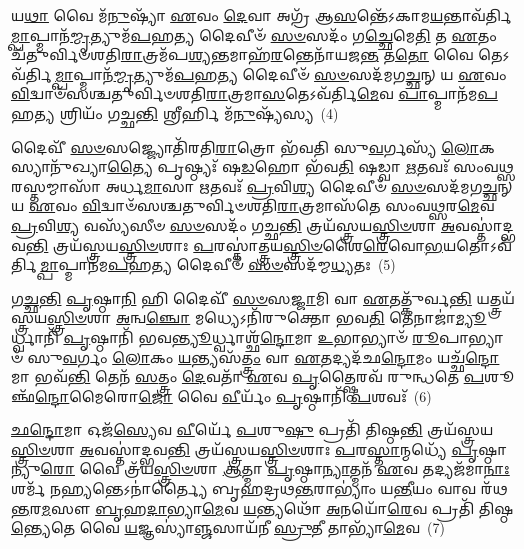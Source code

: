 𑌯\-\ul{𑌥𑌾} 𑌵𑍈 𑌮᳴\-\ul{𑌨𑍁}\-𑌷𑍍𑌯𑌾᳴ \ul{𑌏}\-𑌵𑌂 \ul{𑌦𑍇}\-𑌵𑌾 𑌅𑌗𑍍𑌰᳴ 𑌆\-\ul{𑌸}\-𑌨𑍍𑌤𑍇᳴\-𑌽𑌕𑌾𑌮\-\ul{𑌯}\-𑌨𑍍𑌤𑌾𑌵᳴𑌰𑍍𑌤𑌿\-\ul{𑌮𑍍𑌪𑌾}\-𑌪𑍍𑌮𑌾𑌨᳴\-\ul{𑌮𑍍𑌮𑍃}\-𑌤𑍍𑌯𑍁𑌮᳴\-\ul{𑌪}\-𑌹\-\ul{𑌤𑍍𑌯} 𑌦𑍈𑌵𑍀𑍞᳴ \ul{𑌸}\-\-\ul{𑍞}\-𑌸𑌦𑌂᳴ 𑌗\-\ul{𑌚𑍍𑌛𑍇}\-𑌮𑍇\-\ul{𑌤𑌿} 𑌤 \ul{𑌏}\-𑌤𑌂 𑌚᳴𑌤𑍁𑌰𑍍𑌵𑌿𑍞𑌶𑌤𑌿\-\ul{𑌰𑌾}\-𑌤𑍍𑌰𑌮᳴𑌪\-\ul{𑌶𑍍𑌯}\-𑌨𑍍𑌤𑌮𑌾𑌹᳴\-\ul{𑌰}\-𑌨𑍍𑌤𑍇𑌨𑌾᳴𑌯𑌜\-\ul{𑌨𑍍𑌤} 𑌤\-\ul{𑌤𑍋} 𑌵𑍈 𑌤𑍇\-𑌽𑌵᳴𑌰𑍍𑌤𑌿\-\ul{𑌮𑍍𑌪𑌾}\-𑌪𑍍𑌮𑌾𑌨᳴\-\ul{𑌮𑍍𑌮𑍃}\-𑌤𑍍𑌯𑍁𑌮᳴\-\ul{𑌪}\-𑌹\-\ul{𑌤𑍍𑌯} 𑌦𑍈𑌵𑍀𑍞᳴ \ul{𑌸}\-\-\ul{𑍞}\-𑌸𑌦᳴𑌮𑌗\-\ul{𑌚𑍍𑌛}\-𑌨𑍍 𑌯 \ul{𑌏}\-𑌵𑌂 \ul{𑌵𑌿}\-𑌦𑍍𑌵𑌾𑍞᳴𑌸𑌶𑍍𑌚𑌤𑍁𑌰𑍍𑌵𑌿𑍞𑌶𑌤𑌿\-\ul{𑌰𑌾}\-𑌤𑍍𑌰𑌮𑌾\-\ul{𑌸}\-𑌤𑍇\-𑌽𑌵᳴𑌰𑍍𑌤𑌿\-\ul{𑌮𑍇}\-𑌵 \ul{𑌪𑌾}\-𑌪𑍍𑌮𑌾𑌨᳴𑌮\-\ul{𑌪}\-𑌹\-\ul{𑌤𑍍𑌯} 𑌶𑍍𑌰𑌿𑌯𑌂᳴ 𑌗𑌚𑍍𑌛\-\ul{𑌨𑍍𑌤𑌿} 𑌶𑍍𑌰𑍀𑌰𑍍\mbox{}𑌹𑌿 𑌮᳴\-\ul{𑌨𑍁}\-𑌷𑍍𑌯᳴𑌸𑍍𑌯~(4)

𑌦𑍈𑌵𑍀᳴ \ul{𑌸}\-\-\ul{𑍞}\-𑌸𑌜𑍍𑌜𑍍𑌯𑍋𑌤𑌿᳴𑌰𑌤𑌿\-\ul{𑌰𑌾}\-𑌤𑍍𑌰𑍋 𑌭᳴𑌵𑌤𑌿 𑌸𑍁\-\ul{𑌵}\-𑌰𑍍𑌗𑌸𑍍𑌯᳴ \ul{𑌲𑍋}\-𑌕𑌸𑍍𑌯𑌾𑌨𑍁᳴𑌖𑍍𑌯𑌾\-\ul{𑌤𑍍𑌯𑍈} 𑌪𑍃𑌷𑍍𑌠𑍍𑌯𑌃᳴ 𑌷\-\ul{𑌡}\-𑌹𑍋 𑌭᳴𑌵\-\ul{𑌤𑌿} 𑌷𑌡𑍍𑌵𑌾 \ul{𑌋}\-𑌤𑌵𑌃᳴ 𑌸𑌂𑌵\-\ul{𑌥𑍍𑌸}\-𑌰𑌸𑍍𑌤𑌮𑍍𑌮𑌾𑌸𑌾᳴ 𑌅𑌰𑍍𑌧\-\ul{𑌮𑌾}\-𑌸𑌾 \ul{𑌋}\-𑌤𑌵𑌃᳴ \ul{𑌪𑍍𑌰}\-𑌵𑌿\-\ul{𑌶𑍍𑌯} 𑌦𑍈𑌵𑍀𑍞᳴ \ul{𑌸}\-\-\ul{𑍞}\-𑌸𑌦᳴𑌮𑌗\-\ul{𑌚𑍍𑌛}\-𑌨𑍍 𑌯 \ul{𑌏}\-𑌵𑌂 \ul{𑌵𑌿}\-𑌦𑍍𑌵𑌾𑍞᳴𑌸𑌶𑍍𑌚𑌤𑍁𑌰𑍍𑌵𑌿𑍞𑌶𑌤𑌿\-\ul{𑌰𑌾}\-𑌤𑍍𑌰𑌮𑌾𑌸᳴𑌤𑍇 𑌸𑌂𑌵\-\ul{𑌥𑍍𑌸}\-𑌰\-\ul{𑌮𑍇}\-𑌵 \ul{𑌪𑍍𑌰}\-𑌵𑌿\-\ul{𑌶𑍍𑌯} 𑌵𑌸𑍍𑌯᳴𑌸𑍀𑍞 \ul{𑌸}\-\-\ul{𑍞}\-𑌸𑌦𑌂᳴ 𑌗𑌚𑍍𑌛\-\ul{𑌨𑍍𑌤𑌿} 𑌤𑍍𑌰𑌯᳴𑌸𑍍𑌤𑍍𑌰𑌯\-\ul{𑌸𑍍𑌤𑍍𑌰𑌿}\-\-\ul{𑍞}\-𑌶𑌾 \ul{𑌅}\-𑌵𑌸𑍍𑌤𑌾॑𑌦𑍍𑌭𑌵\-\ul{𑌨𑍍𑌤𑌿} 𑌤𑍍𑌰𑌯᳴𑌸𑍍𑌤𑍍𑌰𑌯\-\ul{𑌸𑍍𑌤𑍍𑌰𑌿}\-\-\ul{𑍞}\-𑌶𑌾𑌃 \ul{𑌪}\-𑌰𑌸𑍍𑌤𑌾॑𑌤𑍍𑌤𑍍𑌰𑌯\-\ul{𑌸𑍍𑌤𑍍𑌰𑌿}\-\-\ul{𑍞}\-𑌶𑍈\-\ul{𑌰𑍇}\-𑌵𑍋\-\ul{𑌭}\-𑌯𑌤𑍋\-𑌽𑌵᳴𑌰𑍍𑌤𑌿\-\ul{𑌮𑍍𑌪𑌾}\-𑌪𑍍𑌮𑌾𑌨᳴𑌮\-\ul{𑌪}\-𑌹\-\ul{𑌤𑍍𑌯} 𑌦𑍈𑌵𑍀𑍞᳴ \ul{𑌸}\-\-\ul{𑍞}\-𑌸𑌦᳴𑌮𑍍𑌮\-\ul{𑌧𑍍𑌯}\-𑌤𑌃~(5)

\-\ul{𑌗}\-\-\ul{𑌚𑍍𑌛}\-\-\ul{𑌨𑍍𑌤𑌿} \ul{𑌪𑍃}\-𑌷𑍍𑌠𑌾\-\ul{𑌨𑌿} 𑌹𑌿 𑌦𑍈𑌵𑍀᳴ \ul{𑌸}\-\-\ul{𑍞}\-𑌸\-\ul{𑌜𑍍𑌜𑌾}\-𑌮𑌿 𑌵𑌾 \ul{𑌏}\-𑌤𑌤𑍍𑌕𑍁᳴𑌰𑍍𑌵\-\ul{𑌨𑍍𑌤𑌿} 𑌯𑌤𑍍𑌤𑍍𑌰𑌯᳴𑌸𑍍𑌤𑍍𑌰𑌯\-\ul{𑌸𑍍𑌤𑍍𑌰𑌿}\-\-\ul{𑍞}\-𑌶𑌾 \ul{𑌅}\-𑌨𑍍𑌵\-\ul{𑌞𑍍𑌚𑍋} 𑌮𑌧𑍍𑌯𑍇\-𑌽𑌨𑌿᳴𑌰𑍁𑌕𑍍𑌤𑍋 𑌭𑌵\-\ul{𑌤𑌿} 𑌤𑍇𑌨𑌾𑌜𑌾॑\-\ul{𑌮𑍍𑌯𑍂}\-𑌰𑍍𑌧𑍍𑌵𑌾𑌨𑌿᳴ \ul{𑌪𑍃}\-𑌷𑍍𑌠𑌾𑌨𑌿᳴ 𑌭𑌵\-\ul{𑌨𑍍𑌤𑍍𑌯𑍂}\-𑌰𑍍𑌧𑍍𑌵𑌾𑌶𑍍𑌛᳴\-\ul{𑌨𑍍𑌦𑍋}\-𑌮𑌾 \ul{𑌉}\-𑌭𑌾𑌭𑍍𑌯𑌾𑍞᳴ \ul{𑌰𑍂}\-𑌪𑌾𑌭𑍍𑌯𑌾𑍞᳴ 𑌸𑍁\-\ul{𑌵}\-𑌰𑍍𑌗𑌂 \ul{𑌲𑍋}\-𑌕𑌂 \ul{𑌯}\-𑌨𑍍𑌤𑍍𑌯𑌸᳴\-\ul{𑌤𑍍𑌤𑍍𑌰𑌂} 𑌵𑌾 \ul{𑌏}\-𑌤𑌦𑍍𑌯𑌦᳴𑌛\-\ul{𑌨𑍍𑌦𑍋}\-𑌮𑌂 𑌯𑌚𑍍𑌛᳴\-\ul{𑌨𑍍𑌦𑍋}\-𑌮𑌾 𑌭𑌵᳴\-\ul{𑌨𑍍𑌤𑌿} 𑌤𑍇𑌨᳴ \ul{𑌸}\-𑌤𑍍𑌤𑍍𑌰𑌂 \ul{𑌦𑍇}\-𑌵𑌤𑌾᳴ \ul{𑌏}\-𑌵 \ul{𑌪𑍃}\-𑌤𑍍𑌷𑍍𑌠𑍈𑌰𑌵᳴ 𑌰𑍁𑌨𑍍𑌧𑌤𑍇 \ul{𑌪}\-𑌶𑍂𑌞𑍍𑌛᳴\-\ul{𑌨𑍍𑌦𑍋}\-𑌮𑍈𑌰𑍋\-\ul{𑌜𑍋} 𑌵𑍈 \ul{𑌵𑍀}\-𑌰𑍍𑌯𑌂᳴ \ul{𑌪𑍃}\-𑌷𑍍𑌠𑌾𑌨𑌿᳴ \ul{𑌪}\-𑌶𑌵𑌃᳴~(6)

\-\ul{𑌛}\-\-\ul{𑌨𑍍𑌦𑍋}\-𑌮𑌾 𑌓𑌜᳴\-\ul{𑌸𑍍𑌯𑍇}\-𑌵 \ul{𑌵𑍀}\-𑌰𑍍𑌯𑍇᳴ \ul{𑌪}\-𑌶𑍁\-\ul{𑌷𑍁} 𑌪𑍍𑌰𑌤𑌿᳴ 𑌤𑌿𑌷𑍍𑌠\-\ul{𑌨𑍍𑌤𑌿} 𑌤𑍍𑌰𑌯᳴𑌸𑍍𑌤𑍍𑌰𑌯\-\ul{𑌸𑍍𑌤𑍍𑌰𑌿}\-\-\ul{𑍞}\-𑌶𑌾 \ul{𑌅}\-𑌵𑌸𑍍𑌤𑌾॑𑌦𑍍𑌭𑌵\-\ul{𑌨𑍍𑌤𑌿} 𑌤𑍍𑌰𑌯᳴𑌸𑍍𑌤𑍍𑌰𑌯\-\ul{𑌸𑍍𑌤𑍍𑌰𑌿}\-\-\ul{𑍞}\-𑌶𑌾𑌃 \ul{𑌪}\-𑌰\-\ul{𑌸𑍍𑌤𑌾}\-𑌨𑍍𑌮𑌧𑍍𑌯𑍇᳴ \ul{𑌪𑍃}\-𑌷𑍍𑌠𑌾𑌨𑍍𑌯𑍁\-\ul{𑌰𑍋} 𑌵𑍈 𑌤𑍍𑌰᳴𑌯\-\ul{𑌸𑍍𑌤𑍍𑌰𑌿}\-\-\ul{𑍞}\-𑌶𑌾 \ul{𑌆}\-𑌤𑍍𑌮𑌾 \ul{𑌪𑍃}\-𑌷𑍍𑌠𑌾\-\ul{𑌨𑍍𑌯𑌾}\-𑌤𑍍𑌮𑌨᳴ \ul{𑌏}\-𑌵 𑌤𑌦𑍍𑌯𑌜᳴𑌮𑌾\-\ul{𑌨𑌾𑌃} 𑌶𑌰𑍍𑌮᳴ 𑌨\-\ul{𑌹𑍍𑌯}\-𑌨𑍍𑌤𑍇\-𑌽𑌨𑌾॑𑌰𑍍𑌤𑍍𑌯𑍈 𑌬𑍃𑌹𑌦𑍍𑌰𑌥\-\ul{𑌨𑍍𑌤}\-𑌰𑌾\-𑌭𑍍𑌯𑌾𑌂॑ 𑌯\-\ul{𑌨𑍍𑌤𑍀}\-𑌯𑌂 𑌵𑌾𑌵 𑌰᳴𑌥\-\ul{𑌨𑍍𑌤}\-𑌰\-\ul{𑌮}\-𑌸𑍗 \ul{𑌬𑍃}\-𑌹\-\ul{𑌦𑌾}\-𑌭𑍍𑌯𑌾\-\ul{𑌮𑍇}\-𑌵 \ul{𑌯}\-𑌨𑍍𑌤𑍍𑌯𑌥𑍋᳴ \ul{𑌅}\-𑌨𑌯𑍋᳴\-\ul{𑌰𑍇}\-𑌵 𑌪𑍍𑌰𑌤𑌿᳴ 𑌤𑌿𑌷𑍍𑌠\-\ul{𑌨𑍍𑌤𑍍𑌯𑍇}\-𑌤𑍇 𑌵𑍈 \ul{𑌯}\-𑌜𑍍𑌞𑌸𑍍𑌯𑌾॑\-\ul{𑌞𑍍𑌜}\-𑌸𑌾𑌯᳴𑌨𑍀 \ul{𑌸𑍍𑌰𑍁}\-𑌤𑍀 𑌤𑌾𑌭𑍍𑌯𑌾᳴\-\ul{𑌮𑍇}\-𑌵~(7)

